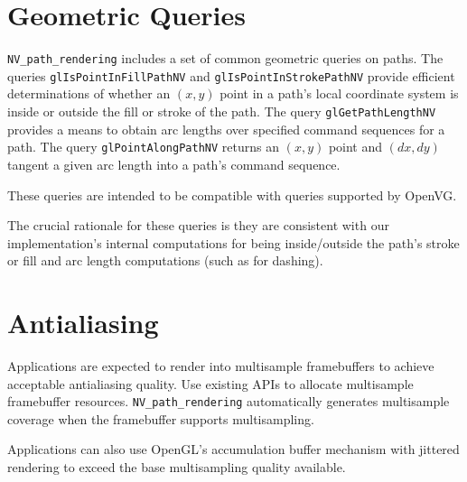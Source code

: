 \section{Geometric Queries}

{\tt NV\_path\_rendering} includes a set of common geometric queries on
paths.  The queries {\tt glIsPointInFillPathNV} and {\tt glIsPointInStrokePathNV} provide
efficient determinations of whether an $(x,y)$ point in a path's local
coordinate system is inside or outside the fill or stroke of the path.
The query {\tt glGetPathLengthNV} provides a means to obtain arc lengths over
specified command sequences for a path.  The query {\tt glPointAlongPathNV}
returns an $(x,y)$ point and $(dx,dy)$ tangent a given arc length into a
path's command sequence.

These queries are intended to be compatible with queries supported by OpenVG.

The crucial rationale for these queries is they are consistent with
our implementation's internal computations for being inside/outside the
path's stroke or fill and arc length computations (such as for dashing).

\section{Antialiasing}

Applications are expected to render into multisample framebuffers to achieve
acceptable antialiasing quality.  Use existing APIs to allocate multisample
framebuffer resources.  {\tt NV\_path\_rendering} automatically generates multisample
coverage when the framebuffer supports multisampling.

Applications can also use OpenGL's accumulation buffer mechanism with jittered
rendering to exceed the base multisampling quality available.
